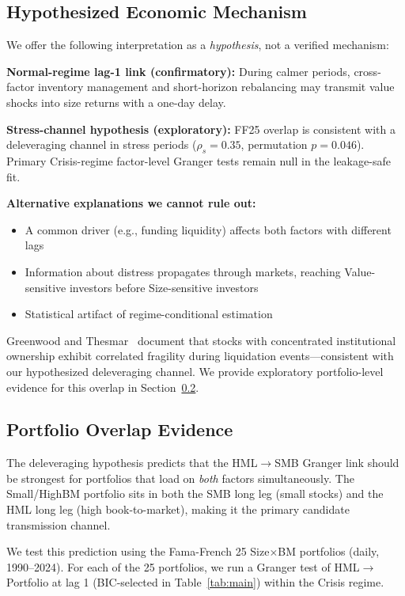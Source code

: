 \documentclass{uai2026}
\begin{document}
\subsection{Hypothesized Economic Mechanism}
\label{sec:interpretation}

We offer the following interpretation as a \emph{hypothesis}, not a verified mechanism:

\textbf{Normal-regime lag-1 link (confirmatory):} During calmer periods,
cross-factor inventory management and short-horizon rebalancing may transmit
value shocks into size returns with a one-day delay.

\textbf{Stress-channel hypothesis (exploratory):} FF25 overlap is consistent with
a deleveraging channel in stress periods
($\rho_s = 0.35$, permutation $p = 0.046$). Primary Crisis-regime factor-level
Granger tests remain null in the leakage-safe fit.

\textbf{Alternative explanations we cannot rule out:}
\begin{itemize}
    \item A common driver (e.g., funding liquidity) affects both factors with different lags
    \item Information about distress propagates through markets, reaching Value-sensitive
    investors before Size-sensitive investors
    \item Statistical artifact of regime-conditional estimation
\end{itemize}

Greenwood and Thesmar~\cite{greenwood2011stock} document that stocks with
concentrated institutional ownership exhibit correlated fragility during
liquidation events---consistent with our hypothesized deleveraging channel.
We provide exploratory portfolio-level evidence for this overlap in
Section~\ref{sec:overlap_evidence}.

\subsection{Portfolio Overlap Evidence}
\label{sec:overlap_evidence}

The deleveraging hypothesis predicts that the HML$\to$SMB Granger link should
be strongest for portfolios that load on \emph{both} factors simultaneously.
The Small\-/HighBM portfolio sits in both the SMB long leg (small stocks) and
the HML long leg (high book-to-market), making it the primary candidate
transmission channel.

We test this prediction using the Fama-French 25 Size$\times$BM portfolios
(daily, 1990--2024). For each of the 25 portfolios, we run a Granger test
of HML$\to$Portfolio at lag 1 (BIC-selected in Table~\ref{tab:main}) within
the Crisis regime.
\end{document}
